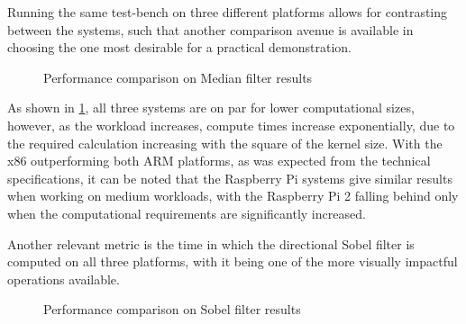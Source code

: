 Running the same test-bench on three different platforms allows for contrasting between the systems, such that
another comparison avenue is available in choosing the one most desirable for a practical demonstration.

\begin{figure}[H]
    \label{fig:medianResults}
    \caption{Performance comparison on Median filter results}
\end{figure}

As shown in \cref{fig:medianResults}, all three systems are on par for lower computational sizes, however, as
the workload increases, compute times increase exponentially, due to the required calculation increasing with
the square of the kernel size. With the x86 outperforming both ARM platforms, as was expected from the 
technical specifications, it can be noted that the Raspberry Pi systems give similar results when working
on medium workloads, with the Raspberry Pi 2 falling behind only when the computational requirements are
significantly increased.

Another relevant metric is the time in which the directional Sobel filter is computed on all three platforms,
with it being one of the more visually impactful operations available.

\begin{figure}[H]
    \label{fig:sobelResults}
    \caption{Performance comparison on Sobel filter results}
\end{figure}

